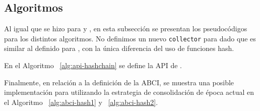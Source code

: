 
\subsection{Algoritmos}\label{subsubsec:details}

Al igual que se hizo para \vanilla y \compresschain, en esta subsección se presentan los pseudocódigos
para los distintos algoritmos. No definimos un nuevo \texttt{collector} para \hashchain dado que
es similar al definido
para \compresschain, con la única diferencia del uso de funciones hash.

En el Algoritmo ~\ref{alg:api-hashchain} se define la API de \setchain.




Finalmente, en relación a la definición de la ABCI, se muestra una posible implementación para
\hashchain utilizando la estrategia de consolidación de época actual en el Algoritmo ~\ref{alg:abci-hash1}
y ~\ref{alg:abci-hash2}.

